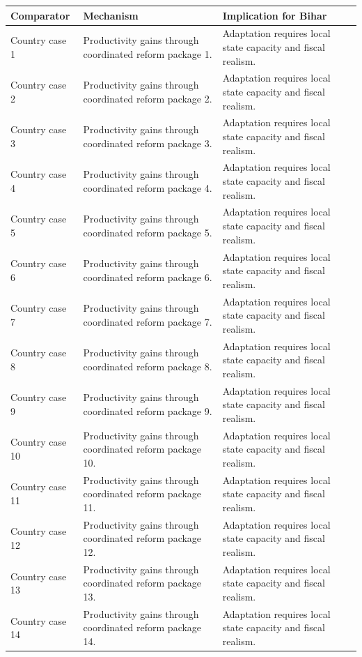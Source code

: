\documentclass[preprint,12pt]{elsarticle}
\begin{document}
\begin{table}[h]\centering\begin{tabular}{p{3cm}p{5cm}p{6cm}}\toprule Comparator & Mechanism & Implication for Bihar \\ \midrule
Country case 1 & Productivity gains through coordinated reform package 1. & Adaptation requires local state capacity and fiscal realism. \\
Country case 2 & Productivity gains through coordinated reform package 2. & Adaptation requires local state capacity and fiscal realism. \\
Country case 3 & Productivity gains through coordinated reform package 3. & Adaptation requires local state capacity and fiscal realism. \\
Country case 4 & Productivity gains through coordinated reform package 4. & Adaptation requires local state capacity and fiscal realism. \\
Country case 5 & Productivity gains through coordinated reform package 5. & Adaptation requires local state capacity and fiscal realism. \\
Country case 6 & Productivity gains through coordinated reform package 6. & Adaptation requires local state capacity and fiscal realism. \\
Country case 7 & Productivity gains through coordinated reform package 7. & Adaptation requires local state capacity and fiscal realism. \\
Country case 8 & Productivity gains through coordinated reform package 8. & Adaptation requires local state capacity and fiscal realism. \\
Country case 9 & Productivity gains through coordinated reform package 9. & Adaptation requires local state capacity and fiscal realism. \\
Country case 10 & Productivity gains through coordinated reform package 10. & Adaptation requires local state capacity and fiscal realism. \\
Country case 11 & Productivity gains through coordinated reform package 11. & Adaptation requires local state capacity and fiscal realism. \\
Country case 12 & Productivity gains through coordinated reform package 12. & Adaptation requires local state capacity and fiscal realism. \\
Country case 13 & Productivity gains through coordinated reform package 13. & Adaptation requires local state capacity and fiscal realism. \\
Country case 14 & Productivity gains through coordinated reform package 14. & Adaptation requires local state capacity and fiscal realism. \\

\end{tabular}
\end{table}
\end{document}
